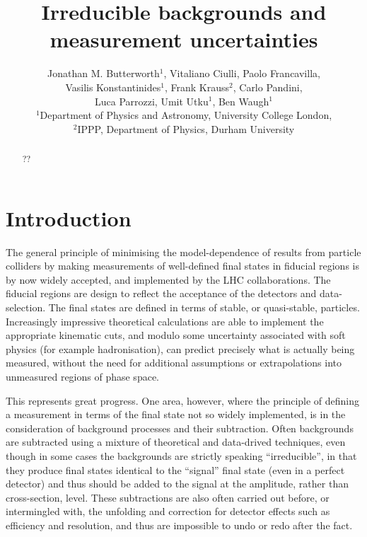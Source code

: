 \documentclass[11pt]{cernrep}
\begin{document}
 
\title{Irreducible backgrounds and measurement uncertainties}

\author{Jonathan M. Butterworth$^1$, Vitaliano Ciulli, Paolo Francavilla,\\ Vasilis Konstantinides$^1$, Frank Krauss$^2$, Carlo Pandini,\\
Luca Parrozzi, Umit Utku$^1$, Ben Waugh$^1$ \\
$^1$Department of Physics and Astronomy, University College London,\\ 
$^2$IPPP, Department of Physics, Durham University}

\maketitle 

\begin{abstract}
??
\end{abstract}

\section{Introduction}
\label{sec:intro}

The general principle of minimising the model-dependence of results from particle colliders by making measurements of 
well-defined final states in fiducial regions is by now widely accepted, and implemented by the LHC collaborations. 
The fiducial regions are design to reflect  the acceptance of the detectors and data-selection. 
The final states are defined in terms of stable, or quasi-stable,
particles. Increasingly impressive theoretical calculations are able to implement the appropriate kinematic cuts, and
modulo some uncertainty associated with soft physics (for example hadronisation), can predict precisely what 
is actually being measured, without the need for additional assumptions or extrapolations into unmeasured regions of 
phase space.

This represents great progress. One area, however, where the principle of defining a measurement in terms of the final state
not so widely implemented, is in the consideration of background processes and their subtraction. 
Often backgrounds are subtracted using a mixture of theoretical and data-drived techniques, 
even though in some cases the backgrounds are strictly speaking ``irreducible'', in that they produce final states 
identical to the ``signal'' final state (even in a perfect detector) and thus should be added to the signal 
at the amplitude, rather than cross-section, level. These subtractions are also often carried out before, or intermingled with, 
the unfolding and correction for detector effects such as efficiency and resolution, and thus are impossible to
undo or redo after the fact. 
\end{document}
